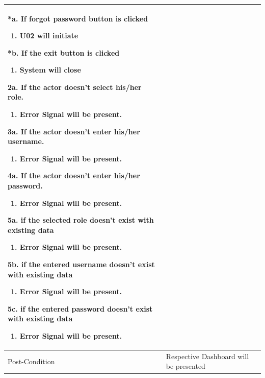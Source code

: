 \documentclass[12pt,a4paper]{article}
\begin{document}
\begin{longtable}{| p{3cm}|p{12cm}|}
 *a. If forgot password button is clicked 
 \begin{enumerate}
		\item U02 will initiate
	\end{enumerate}
 *b. If the exit button is clicked
	\begin{enumerate}
		\item System will close
	\end{enumerate}
 2a. If the actor doesn't select his/her role.
 	\begin{enumerate}
		\item Error Signal will be present.
	\end{enumerate}
3a. If the actor doesn't enter his/her username.
 	\begin{enumerate}
		\item Error Signal will be present.
	\end{enumerate}
4a. If the actor doesn't enter his/her password.
 	\begin{enumerate}
		\item Error Signal will be present.
	\end{enumerate}
5a. if the selected role doesn't exist with existing data
	\begin{enumerate}
		\item Error Signal will be present.
	\end{enumerate}
5b. if the entered username doesn't exist with existing data
	\begin{enumerate}
		\item Error Signal will be present.
	\end{enumerate}
5c. if the entered password doesn't exist with existing data
	\begin{enumerate}
		\item Error Signal will be present.
	\end{enumerate}
	
\\ \hline
Post-Condition & Respective Dashboard will be presented   \\\hline
\end{longtable}
\end{document}
